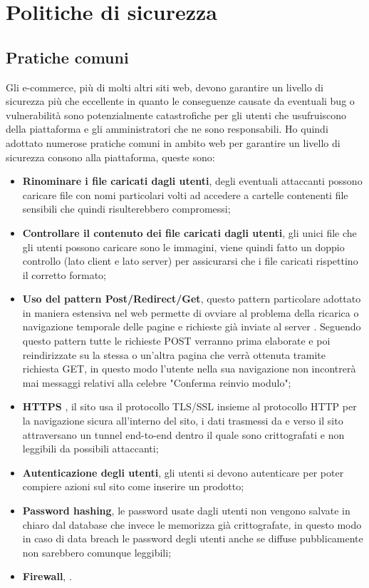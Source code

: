 \section{Politiche di sicurezza}
\subsection{Pratiche comuni}
Gli e-commerce, più di molti altri siti web, devono garantire un livello di sicurezza più che eccellente in quanto le conseguenze causate da eventuali bug o vulnerabilità sono potenzialmente catastrofiche per gli utenti che usufruiscono della piattaforma e gli amministratori che ne sono responsabili. Ho quindi adottato numerose pratiche comuni in ambito web per garantire un livello di sicurezza consono alla piattaforma, queste sono: 
\begin{itemize}
    \item \textbf{Rinominare i file caricati dagli utenti}, degli eventuali attaccanti possono caricare file con nomi particolari volti ad accedere a cartelle contenenti file sensibili che quindi risulterebbero compromessi; 
    \item \textbf{Controllare il contenuto dei file caricati dagli utenti}, gli unici file che gli utenti possono caricare sono le immagini, viene quindi fatto un doppio controllo (lato client e lato server) per assicurarsi che i file caricati rispettino il corretto formato; 
    \item \textbf{Uso del pattern Post/Redirect/Get}, questo pattern particolare adottato in maniera estensiva nel web permette di ovviare al problema della ricarica o navigazione temporale delle pagine e richieste già inviate al server \cite{PRG}. Seguendo questo pattern tutte le richieste POST verranno prima elaborate e poi reindirizzate su la stessa o un'altra pagina che verrà ottenuta tramite richiesta GET, in questo modo l'utente nella sua navigazione non incontrerà mai messaggi relativi alla celebre "Conferma reinvio modulo"; 
    \item \textbf{HTTPS} \cite{HTTPS}, il sito usa il protocollo TLS/SSL insieme al protocollo HTTP per la navigazione sicura all'interno del sito, i dati trasmessi da e verso il sito attraversano un tunnel end-to-end dentro il quale sono crittografati e non leggibili da possibili attaccanti; 
    \item \textbf{Autenticazione degli utenti}, gli utenti si devono autenticare per poter compiere azioni sul sito come inserire un prodotto; 
    \item \textbf{Password hashing}, le password usate dagli utenti non vengono salvate in chiaro dal database che invece le memorizza già crittografate, in questo modo in caso di data breach le password degli utenti anche se diffuse pubblicamente non sarebbero comunque leggibili;
    \item \textbf{Firewall}, .  
\end{itemize} 
